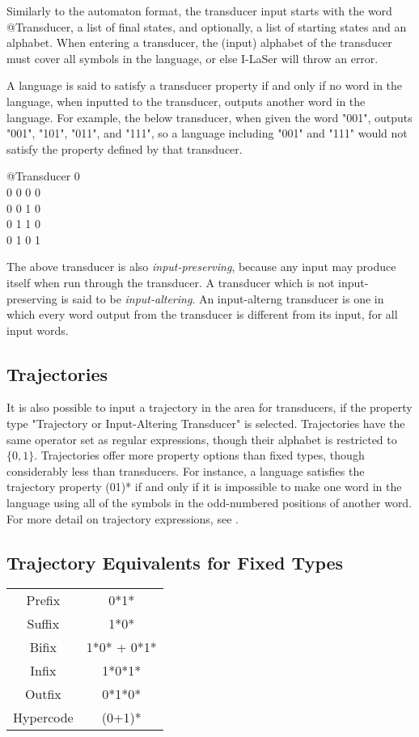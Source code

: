 \documentclass{article}
\begin{document}
Similarly to the automaton format, the transducer input starts with the word @Transducer, a list of final states, and optionally, a list of starting states and an alphabet.
When entering a transducer, the (input) alphabet of the transducer must cover all symbols in the language, or else I-LaSer will throw an error.

A language is said to satisfy a transducer property if and only if no word in the language, when inputted to the transducer, outputs another word in the language. 
For example, the below transducer, when given the word "001", outputs "001", "101", "011", and "111", so a language including "001" and "111" would not satisfy the property defined by that transducer.
\begin{center}
@Transducer 0\\
0 0 0 0\\
0 0 1 0\\
0 1 1 0\\
0 1 0 1\\
\end{center}
The above transducer is also \textit{input-preserving}, because any input may produce itself when run through the transducer. 
A transducer which is not input-preserving is said to be \textit{input-altering}. An input-alterng transducer is one in which every word output from the transducer is different from its input, for all input words.

\subsection{Trajectories}
It is also possible to input a trajectory in the area for transducers, if the property type "Trajectory or Input-Altering Transducer" is selected.
Trajectories have the same operator set as regular expressions, %
though their alphabet is restricted to $\{0, 1\}$.
Trajectories offer more property options than fixed types, though considerably less than transducers.
For instance, a language satisfies the trajectory property (01)* if and only if it is impossible to make one word in the language using all of the symbols in the odd-numbered positions of another word.
For more detail on trajectory expressions, see \cite{traj}.

\subsection{Trajectory Equivalents for Fixed Types}
\begin{center}
\begin{tabular}{c c}
Prefix & 0*1*\\
Suffix & 1*0*\\
Bifix & 1*0* + 0*1*\\
Infix & 1*0*1*\\
Outfix & 0*1*0*\\
Hypercode & (0+1)*
\end{tabular}
\end{center}
\end{document}
